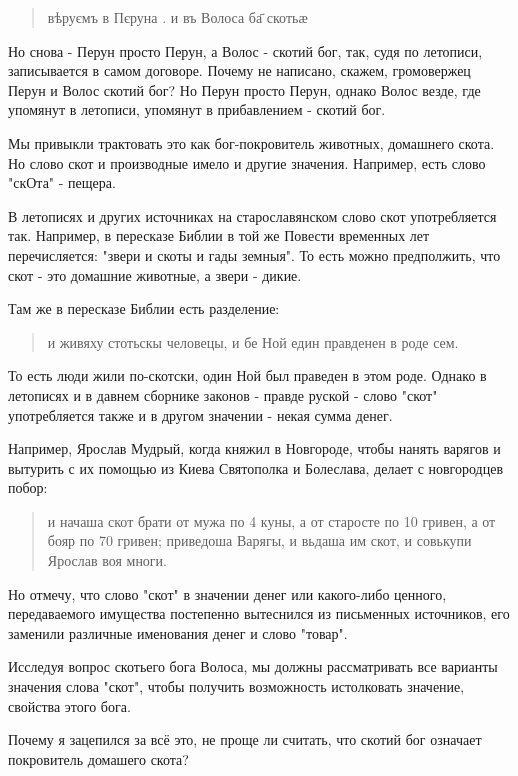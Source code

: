 \documentclass[a5paper,11pt,openany]{article}
\begin{document}
\begin{quotation}
\noindent вѣруємъ в Пєруна . и въ Волоса ба҃ скотьӕ
\end{quotation}

   Но снова - Перун просто Перун, а Волос - скотий бог, так, судя по летописи, записывается в самом договоре. Почему не написано, скажем, громовержец Перун и Волос скотий бог? Но Перун просто Перун, однако Волос везде, где упомянут в летописи, упомянут в прибавлением - скотий бог.

   Мы привыкли трактовать это как бог-покровитель животных, домашнего скота. Но слово скот и производные имело и другие значения. Например, есть слово "скОта" - пещера.

   В летописях и других источниках на старославянском слово скот употребляется так. Например, в пересказе Библии в той же Повести временных лет перечисляется: "звери и скоты и гады земныя". То есть можно предполжить, что скот - это домашние животные, а звери - дикие.

   Там же в пересказе Библии есть разделение:

\begin{quotation}
\noindent и живяху стотьскы человецы, и бе Ной един правденен в роде сем.\end{quotation}

   То есть люди жили по-скотски, один Ной был праведен в этом роде. 
   Однако в летописях и в давнем сборнике законов - правде руской - слово "скот" употребляется также и в другом значении - некая сумма денег.

Например, Ярослав Мудрый, когда княжил в Новгороде, чтобы нанять варягов и вытурить с их помощью из Киева Святополка и Болеслава, делает с новгородцев побор:

\begin{quotation}
\noindent и начаша скот брати от мужа по 4 куны, а от старосте по 10 гривен, а от бояр по 70
гривен; приведоша Варягы, и вьдаша им скот,
и совькупи Ярослав воя многи.\end{quotation}

   Но отмечу, что слово "скот" в значении денег или какого-либо ценного, передаваемого имущества постепенно вытеснился из письменных источников, его заменили различные именования денег и слово "товар".

   Исследуя вопрос скотьего бога Волоса, мы должны рассматривать все варианты значения слова "скот", чтобы получить возможность истолковать значение, свойства этого бога. 

   Почему я зацепился за всё это, не проще ли считать, что скотий бог означает покровитель домашего скота?
\end{document}
